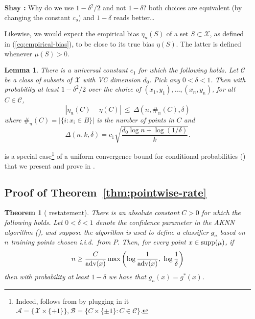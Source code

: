 \documentclass{article}
\def\X{{\mathcal X}}
\def\B{{\mathcal B}}
\def\supp{{\rm supp}}
\def\adv{{\rm adv}}
\newcommand{\cA}{\mathcal{A}}
\newtheorem*{theorem*}{Theorem}
\newtheorem{lemma}[theorem]{Lemma}
\newcommand{\comment}[3]{{\color{#1} {\bf #2 :} #3}}
\newcommand{\new}[1]{\color{red} #1}
\newcommand{\shay}[1]{\comment{purple}{Shay}{#1}}
\begin{document}
\shay{Why do we use $1-\delta^2/2$ and not $1-\delta$? 
both choices are equivalent (by changing the constant $c_o$)
and $1-\delta$ reads better\ldots }


Likewise, we would expect the empirical bias $\eta_n(S)$ of a set $S \subset \X$, as defined in (\ref{eq:empirical-bias}), to be close to its true bias $\eta(S)$. The latter is defined whenever $\mu(S) > 0$.
\begin{lemma}
There is a universal constant $c_1$ for which the following holds. Let $\mathcal{C}$ be a class of subsets of $\X$ with VC dimension $d_0$. Pick any $0 < \delta < 1$. Then with probability at least $1-\delta^2/2$ over the choice of $(x_1, y_1), \ldots, (x_n, y_n)$, for all $C \in \mathcal{C}$,
  $$ \left| \eta_n(C) - \eta(C) \right| \ \leq \ \Delta(n, \#_n(C), \delta) $$
where $\#_n(C) = |\{i: x_i \in B\}|$ is the number of points in $C$ and 
\begin{equation}
\Delta(n,k,\delta) = c_1 \sqrt{\frac{d_0 \log n + \log (1/\delta)}{k}} .
\label{eq:delta-defn}
\end{equation}
\label{lemma:bias}
\end{lemma}

 is a special case\footnote{\new{Indeed, \Cref{lemma:bias} follows from  
by plugging in it $\cA = \{\X\times\{+1\}\}, \B = \{C\times\{\pm 1\} : C\in\mathcal{C}\}$.}} of a uniform convergence bound for conditional probabilities () 
that we present and prove in .


\subsection{Proof of Theorem~\ref{thm:pointwise-rate}}

\begin{theorem*}[ restatement] 
There is an absolute constant $C > 0$ for which the following holds.
Let $0 < \delta < 1$ denote the confidence parameter in the AKNN algorithm (),
and suppose the algorithm is used to define a classifier $g_n$ based on $n$ training points chosen i.i.d.\ from $P$. 
Then, for every point $x\in\supp(\mu)$, if
\[n \geq \frac{C}{\adv(x)} \max \left( \log \frac{1}{\adv(x)}, \ \log \frac{1}{\delta} \right)\]
then with probability at least $1-\delta$ we have that $g_n(x)=g^*(x)$.
\end{theorem*}
\end{document}
